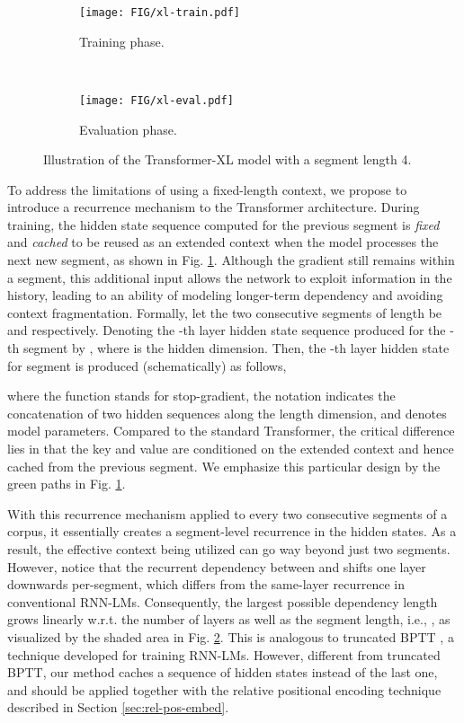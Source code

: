 \documentclass[11pt,a4paper]{article}
\newcommand{\rulesep}{\unskip\ \vrule\ }
\begin{document}
\begin{figure*}[!h]
	\begin{subfigure}[b]{0.62\linewidth}
		\texttt{[image: FIG/xl-train.pdf]}
		\caption{\small Training phase.}
		\label{fig:xl-train}
	\end{subfigure}
	\rulesep
	\begin{subfigure}[b]{0.35\linewidth}
		\texttt{[image: FIG/xl-eval.pdf]}
		\caption{\small Evaluation phase.}
		\label{fig:xl-eval}
	\end{subfigure}
	\caption{\small Illustration of the Transformer-XL model with a segment length 4.}
	\label{fig:xl}
\vspace{-1em}
\end{figure*}
To address the limitations of using a fixed-length context, we propose to introduce a recurrence mechanism to the Transformer architecture.
During training, the hidden state sequence computed for the previous segment is \textit{fixed} and \textit{cached} to be reused as an extended context when the model processes the next new segment, as shown in Fig. \ref{fig:xl-train}.
Although the gradient still remains within a segment, this additional input allows the network to exploit information in the history, leading to an ability of modeling longer-term dependency and avoiding context fragmentation.
Formally, let the two consecutive segments of length  be  and  respectively.
Denoting the -th layer hidden state sequence produced for the -th segment  by , where  is the hidden dimension.
Then, the -th layer hidden state for segment  is produced (schematically) as follows,
\par\nobreak
\vspace{-0.5em}
\small

\normalsize
\vspace{-1.5em}

\noindent where the function  stands for stop-gradient, the notation  indicates the concatenation of two hidden sequences along the length dimension, and  denotes model parameters.
Compared to the standard Transformer, the critical difference lies in that the key  and value  are conditioned on the extended context  and hence  cached from the previous segment.
We emphasize this particular design by the green paths in Fig. \ref{fig:xl-train}.

With this recurrence mechanism applied to every two consecutive segments of a corpus, it essentially creates a segment-level recurrence in the hidden states.
As a result, the effective context being utilized can go way beyond just two segments.
However, notice that the recurrent dependency between  and  shifts one layer downwards per-segment, which differs from the same-layer recurrence in conventional RNN-LMs.
Consequently, the largest possible dependency length grows linearly w.r.t. the number of layers as well as the segment length, i.e., , as visualized by the shaded area in Fig. \ref{fig:xl-eval}.
This is analogous to truncated BPTT \citep{mikolov2010recurrent}, a technique developed for training RNN-LMs. However, different from truncated BPTT, our method caches a sequence of hidden states instead of the last one, and should be applied together with the relative positional encoding technique described in Section \ref{sec:rel-pos-embed}.
\end{document}
